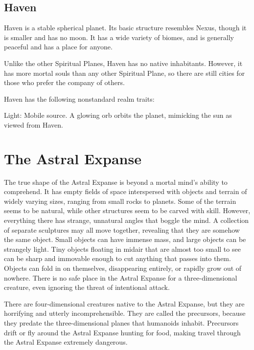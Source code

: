  \subsection{Haven}
    Haven is a stable spherical planet.
    Its basic structure resembles Nexus, though it is smaller and has no moon.
    It has a wide variety of biomes, and is generally peaceful and has a place for anyone.

    Unlike the other Spiritual Planes, Haven has no native inhabitants.
    However, it has more mortal souls than any other Spiritual Plane, so there are still cities for those who prefer the company of others.

    Haven has the following nonstandard realm traits:
    \begin{raggeditemize}
      \item Light: Mobile source. A glowing orb orbits the planet, mimicking the sun as viewed from Haven.
    \end{raggeditemize}

\section{The Astral Expanse}

  The true shape of the Astral Expanse is beyond a mortal mind's ability to comprehend.
  It has empty fields of space interspersed with objects and terrain of widely varying sizes, ranging from small rocks to planets.
  Some of the terrain seems to be natural, while other structures seem to be carved with skill.
  However, everything there has strange, unnatural angles that boggle the mind.
  A collection of separate sculptures may all move together, revealing that they are somehow the same object.
  Small objects can have immense mass, and large objects can be strangely light.
  Tiny objects floating in midair that are almost too small to see can be sharp and immovable enough to cut anything that passes into them.
  Objects can fold in on themselves, disappearing entirely, or rapidly grow out of nowhere.
  There is no safe place in the Astral Expanse for a three-dimensional creature, even ignoring the threat of intentional attack.

  There are four-dimensional creatures native to the Astral Expanse, but they are horrifying and utterly incomprehensible.
  They are called the precursors, because they predate the three-dimensional planes that humanoids inhabit.
  Precursors drift or fly around the Astral Expanse hunting for food, making travel through the Astral Expanse extremely dangerous.

